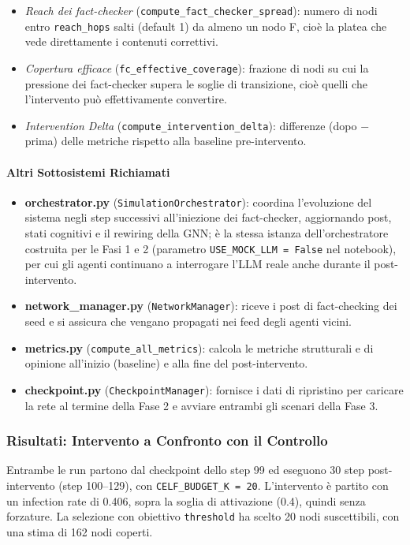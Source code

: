 \documentclass[11pt, a4paper]{article}
\begin{document}
\begin{itemize}[leftmargin=*]
    \begin{itemize}
        \item \textit{Reach dei fact-checker} (\texttt{compute\_fact\_checker\_spread}): numero di nodi entro \texttt{reach\_hops} salti (default 1) da almeno un nodo F, cioè la platea che vede direttamente i contenuti correttivi.
        \item \textit{Copertura efficace} (\texttt{fc\_effective\_coverage}): frazione di nodi su cui la pressione dei fact-checker supera le soglie di transizione, cioè quelli che l'intervento può effettivamente convertire.
        \item \textit{Intervention Delta} (\texttt{compute\_intervention\_delta}): differenze (dopo $-$ prima) delle metriche rispetto alla baseline pre-intervento.
    \end{itemize}
\end{itemize}

\paragraph{Altri Sottosistemi Richiamati}
\begin{itemize}[leftmargin=*]
    \item \textbf{orchestrator.py} (\texttt{SimulationOrchestrator}): coordina l'evoluzione del sistema negli step successivi all'iniezione dei fact-checker, aggiornando post, stati cognitivi e il rewiring della GNN; è la stessa istanza dell'orchestratore costruita per le Fasi 1 e 2 (parametro \texttt{USE\_MOCK\_LLM = False} nel notebook), per cui gli agenti continuano a interrogare l'LLM reale anche durante il post-intervento.
    \item \textbf{network\_manager.py} (\texttt{NetworkManager}): riceve i post di fact-checking dei seed e si assicura che vengano propagati nei feed degli agenti vicini.
    \item \textbf{metrics.py} (\texttt{compute\_all\_metrics}): calcola le metriche strutturali e di opinione all'inizio (baseline) e alla fine del post-intervento.
    \item \textbf{checkpoint.py} (\texttt{CheckpointManager}): fornisce i dati di ripristino per caricare la rete al termine della Fase 2 e avviare entrambi gli scenari della Fase 3.
\end{itemize}

\subsubsection{Risultati: Intervento a Confronto con il Controllo}
Entrambe le run partono dal checkpoint dello step 99 ed eseguono 30 step post-intervento (step 100--129), con \texttt{CELF\_BUDGET\_K = 20}. L'intervento è partito con un infection rate di 0.406, sopra la soglia di attivazione (0.4), quindi senza forzature. La selezione con obiettivo \texttt{threshold} ha scelto 20 nodi suscettibili, con una stima di 162 nodi coperti.
\end{document}
